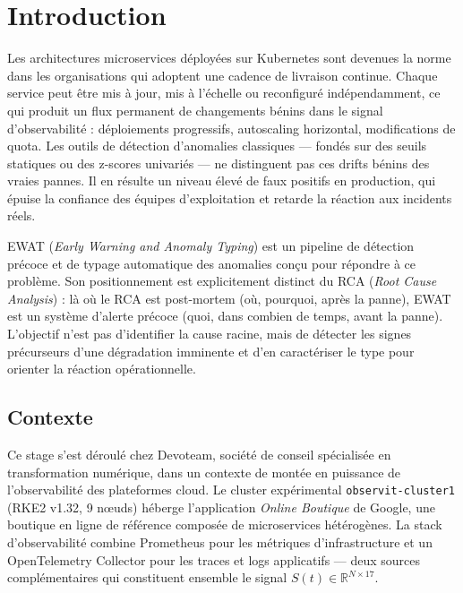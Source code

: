 
\section{Introduction}
\label{sec:intro}

Les architectures microservices déployées sur Kubernetes sont devenues la norme dans les
organisations qui adoptent une cadence de livraison continue. Chaque service peut être mis
à jour, mis à l'échelle ou reconfiguré indépendamment, ce qui produit un flux permanent
de changements bénins dans le signal d'observabilité : déploiements progressifs, autoscaling
horizontal, modifications de quota. Les outils de détection d'anomalies classiques --- fondés
sur des seuils statiques ou des z-scores univariés \cite{myrtollari2025} --- ne distinguent pas
ces drifts bénins des vraies pannes. Il en résulte un niveau élevé de faux positifs en production, qui épuise la
confiance des équipes d'exploitation et retarde la réaction aux incidents réels.

EWAT (\emph{Early Warning and Anomaly Typing}) est un pipeline de détection précoce et de
typage automatique des anomalies conçu pour répondre à ce problème. Son positionnement est
explicitement distinct du RCA (\emph{Root Cause Analysis}) \cite{fu2025} : là où le RCA est post-mortem
(où, pourquoi, après la panne), EWAT est un système d'alerte précoce (quoi, dans combien de
temps, avant la panne). L'objectif n'est pas d'identifier la cause racine, mais de détecter
les signes précurseurs d'une dégradation imminente et d'en caractériser le type pour orienter
la réaction opérationnelle.

\subsection{Contexte}

Ce stage s'est déroulé chez Devoteam, société de conseil spécialisée en transformation
numérique, dans un contexte de montée en puissance de l'observabilité des plateformes cloud.
Le cluster expérimental \texttt{observit-cluster1} (RKE2 v1.32, 9 nœuds) héberge l'application
\emph{Online Boutique} de Google, une boutique en ligne de référence composée de microservices
hétérogènes. La stack d'observabilité combine Prometheus pour les métriques d'infrastructure
et un OpenTelemetry Collector pour les traces et logs applicatifs --- deux sources
complémentaires qui constituent ensemble le signal $S(t) \in \mathbb{R}^{N \times 17}$.

